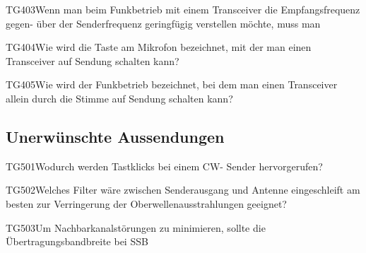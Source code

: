 \begin{question}{TG403}{Wenn man beim Funkbetrieb mit einem Transceiver die Empfangsfrequenz gegen- über der Senderfrequenz geringfügig verstellen möchte, muss man}
\end{question}

\begin{question}{TG404}{Wie wird die Taste am Mikrofon bezeichnet, mit der man einen Transceiver auf Sendung schalten kann?}
\end{question}

\begin{question}{TG405}{Wie wird der Funkbetrieb bezeichnet, bei dem man einen Transceiver allein durch die Stimme auf Sendung schalten kann?}
\end{question}

\subsection{Unerwünschte Aussendungen}

\begin{question}{TG501}{Wodurch werden Tastklicks bei einem CW- Sender hervorgerufen?}
\end{question}

\begin{question}{TG502}{Welches Filter wäre zwischen Senderausgang und Antenne eingeschleift am besten zur Verringerung der Oberwellenausstrahlungen geeignet?}
\end{question}

\begin{question}{TG503}{Um Nachbarkanalstörungen zu minimieren, sollte die Übertragungsbandbreite bei SSB}
\end{question}

